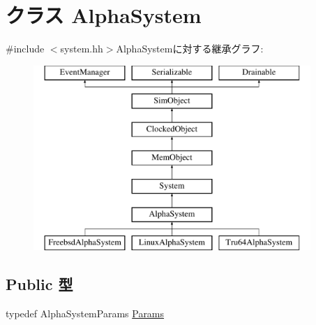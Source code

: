 \hypertarget{classAlphaSystem}{
\section{クラス AlphaSystem}
\label{classAlphaSystem}
}


{\ttfamily \#include $<$system.hh$>$}AlphaSystemに対する継承グラフ:\begin{figure}[H]
\begin{center}
\leavevmode
\includegraphics[height=7cm]{classAlphaSystem}
\end{center}
\end{figure}
\subsection*{Public 型}
\begin{DoxyCompactItemize}
\item 
typedef AlphaSystemParams \hyperlink{classAlphaSystem_a2af24d7a564ee2ca81332fb46406cbe5}{Params}
\end{DoxyCompactItemize}
